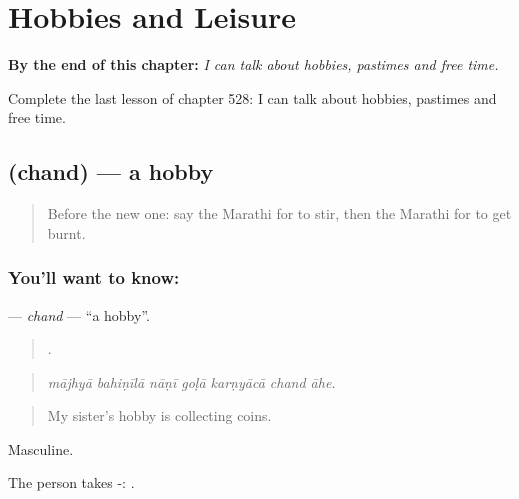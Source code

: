 
\chapter{Hobbies and Leisure}
\label{ch:mr-hobbies-and-leisure}

\begin{chapteropening}
\textbf{By the end of this chapter:} \emph{I can talk about hobbies, pastimes and free time.}

Complete the last lesson of chapter 528: I can talk about hobbies, pastimes and free time.
\end{chapteropening}

\section[\texorpdfstring{\mr{छंद} (chand)}{छंद (chand)}]{ (chand) — a hobby}

\label{lesson:MR-C528-chand}



\begin{quote}
Before the new one: say the Marathi for to stir, then the Marathi for to get burnt.
\end{quote}

\subsection*{You'll want to know: }
\textbf{} — \emph{chand} — \textquotedblleft{}a hobby\textquotedblright{}.

\begin{quote}
      .
\end{quote}

\begin{quote}
\emph{mājhyā bahiṇīlā nāṇī goḷā karṇyācā chand āhe.}
\end{quote}

\begin{quote}
My sister's hobby is collecting coins.
\end{quote}

Masculine.

The person takes -:   .

